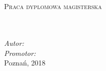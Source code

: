 \documentclass[
12pt, %
oneside, %
polish, %
onehalfspacing, %
headsepline, %
chapterinoneline, %
]{MastersDoctoralThesis} %
\author{inż. Przemysław \textsc{Sałapata}} %
\begin{document}
\selectfont

% 
\pagestyle{plain} %

\begin{titlepage}
	\begin{center}
		
		\vspace*{.06\textheight}
		{\scshape\LARGE \univname\par}%


		\groupname\\\deptname\\[2cm] %
		 

		\textsc{\Large Praca dyplomowa magisterska}\\[0.5cm] %
		
		\HRule \\[0.4cm] %
		{\huge \bfseries \ttitle\par}\vspace{0.4cm} %
		\HRule \\[1.5cm] %
		
				\emph{Autor:}
				\href{mailto:przemyslaw.salapata1@gmail.com}{\authorname} %
		\\
				\emph{Promotor:}
				\href{mailto:krzysztof.budnik@put.poznan.pl}{\supname} %
		\\[8cm]



{\large Poznań, 2018} %

\vfill
\end{center}
\end{titlepage}
\end{document}
